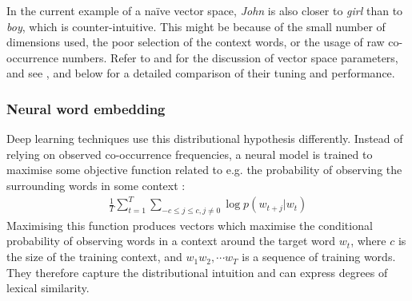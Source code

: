 In the current example of a na{\"i}ve vector space, \textit{John} is also closer to \textit{girl} than to \textit{boy}, which is counter-intuitive. This might be because of the small number of dimensions used, the poor selection of the context words, or the usage of raw co-occurrence numbers. Refer to  and  for the discussion of vector space parameters, and see ,  and
%
 below
%
for a detailed comparison of their tuning and performance.

\subsubsection{Neural word embedding}
\label{sec:neural-embedding}

Deep learning techniques use this distributional hypothesis
differently. Instead of relying on observed co-occurrence frequencies,
a neural model is trained to maximise some objective function related
to e.g. the probability of observing the surrounding words in some
context \cite{mikolov2013distributed}:
%
\begin{align}
 \frac{1}{T}\sum^{T}_{t=1}\sum_{-c \leq j \leq c, j\neq0} \log p(w_{t+j}|w_t)
  \label{eq:objective-func}
\end{align}
%
\noindent
Maximising this function produces vectors which maximise the
conditional probability of observing words in a context around the
target word $w_t$, where $c$ is the size of the training context, and
$w_1 w_2, \cdots w_T$ is a sequence of training words. They therefore
capture the distributional intuition and can express degrees of
lexical similarity.



